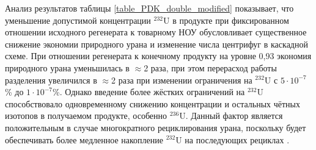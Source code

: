 Анализ результатов таблицы \ref{table_PDK_double_modified} показывает, что уменьшение допустимой концентрации $^{232}$U в продукте при фиксированном отношении исходного регенерата к товарному НОУ обусловливает существенное снижение экономии природного урана и изменение числа центрифуг в каскадной схеме. При отношении регенерата к конечному продукту на уровне 0,93 экономия природного урана уменьшилась в $\approx$2 раза, при этом перерасход работы разделения увеличился в $\approx$2 раза при изменении ограничения на $^{232}$U с $5\cdot10^{-7}$\% до $1\cdot10^{-7}$\%. Однако введение более жёстких ограничений на $^{232}$U способствовало одновременному снижению концентрации и остальных чётных изотопов в получаемом продукте, особенно $^{236}$U. Данный фактор является положительным в случае многократного рециклирования урана, поскольку будет обеспечивать более медленное накопление $^{232}$U на последующих рециклах \cite{smirnovObogashchenieRegenerirovannogoUrana2018}.


